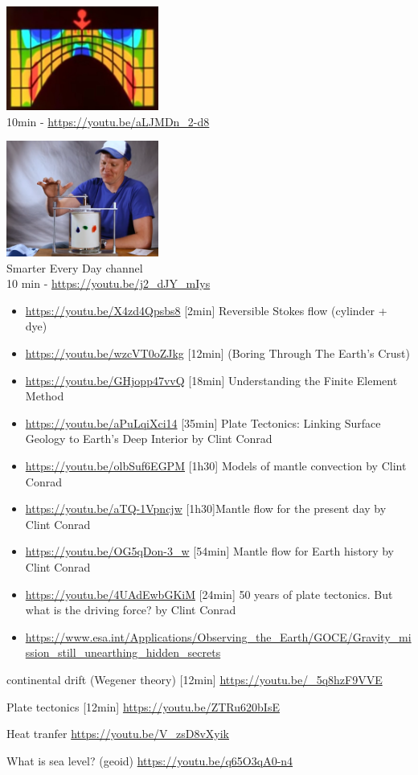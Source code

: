 
\begin{center}
\includegraphics[width=5cm]{images/youtube/superold}\\
10min - \url{https://youtu.be/aLJMDn_2-d8}
\end{center}

\begin{center}
\includegraphics[width=5cm]{images/youtube/smarter}\\
Smarter Every Day channel\\
10 min - \url{https://youtu.be/j2_dJY_mIys}
\end{center}


\begin{itemize}
\item \url{https://youtu.be/X4zd4Qpsbs8} [2min] Reversible Stokes flow (cylinder + dye)
\item \url{https://youtu.be/wzcVT0oZJkg} [12min] (Boring Through The Earth's Crust)
\item \url{https://youtu.be/GHjopp47vvQ} [18min] Understanding the Finite Element Method
\item \url{https://youtu.be/aPuLqiXci14} [35min] Plate Tectonics: Linking Surface Geology to Earth’s Deep Interior by Clint Conrad 
\item \url{https://youtu.be/olbSuf6EGPM} [1h30] Models of mantle convection by Clint Conrad 
\item \url{https://youtu.be/aTQ-1Vpncjw} [1h30]Mantle flow for the present day by Clint Conrad 
\item \url{https://youtu.be/OG5qDon-3_w} [54min] Mantle flow for Earth history by Clint Conrad 
\item \url{https://youtu.be/4UAdEwbGKiM} [24min] 50 years of plate tectonics. But what is the driving force? by Clint Conrad
\item \url{https://www.esa.int/Applications/Observing_the_Earth/GOCE/Gravity_mission_still_unearthing_hidden_secrets}
\end{itemize}


continental drift (Wegener theory) [12min] \url{https://youtu.be/_5q8hzF9VVE}

Plate tectonics [12min]  \url{https://youtu.be/ZTRu620bIsE}

Heat tranfer \url{https://youtu.be/V_zsD8vXyik}

What is sea level? (geoid) \url{https://youtu.be/q65O3qA0-n4} 
